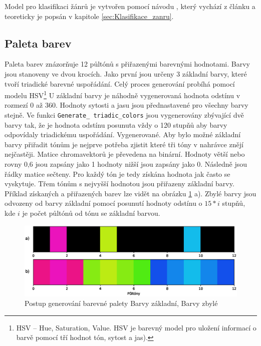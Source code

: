 Model pro klasifikaci žánrů je vytvořen pomocí návodu  \cite{Music_classification_using_deep_learning}, který vychází z článku \cite{Music_genre_classification_paper} a teoreticky je popsán v kapitole \ref{sec:Klasifikace_zanru}. 


\subsection{Paleta barev} \label{sec:Color_palete}

Paleta barev znázorňuje 12 půltónů s přiřazenými barevnými hodnotami. Barvy jsou stanoveny ve dvou krocích. Jako první jsou určeny 3 základní barvy, které tvoří triadické barevné uspořádání. Celý proces generování probíhá pomocí modelu \acs{HSV}\footnote{HSV -- Hue, Saturation, Value. HSV je barevný model pro uložení informací o barvě pomocí tří hodnot tón, sytost a jas).} U základní barvy je náhodně vygenerovaná hodnota odstínu v rozmezí 0 až 360. Hodnoty sytosti a jasu jsou přednastavené pro všechny barvy stejně. Ve funkci \texttt{Generate\_ triadic\_colors} jsou vygenerovány zbývající dvě barvy tak, že je hodnota odstínu posunuta vždy o 120 stupňů aby barvy odpovídaly triadickému uspořádání. Vygenerované. Aby bylo možné základní barvy přiřadit tónům je nejprve potřeba zjistit které tři tóny v nahrávce znějí nejčastěji. Matice chromavektorů je převedena na binární. Hodnoty větší nebo rovny 0,6 jsou zapsány jako 1 hodnoty nižší jsou zapsány jako 0. Následně jsou řádky matice sečteny. Pro každý tón je tedy získána hodnota jak často se vyskytuje. Třem tónům s nejvyšší hodnotou jsou přiřazeny základní barvy. Příklad získaných a přiřazených barev lze vidět na obrázku \ref{fig:Color_palete} a). Zbylé barvy jsou odvozeny od barvy základní pomocí posunutí hodnoty odstínu o $15*i$ stupňů, kde $i$ je počet půltónů od tónu se základní barvou.

\begin{figure}[H]
    \centering
    \includegraphics[width = 1\linewidth]{obrazky/Color_palete.eps}
    \caption{Postup generování barevné palety  Barvy základní,  Barvy zbylé}
    \label{fig:Color_palete}
\end{figure}

